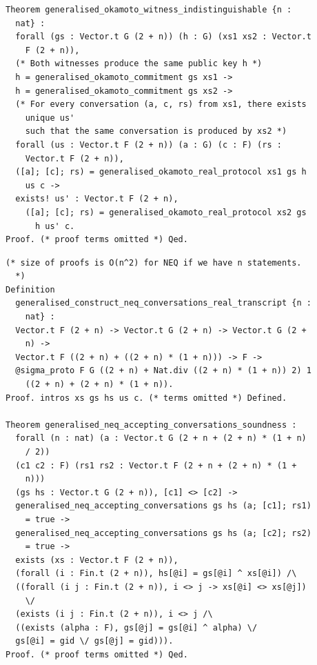 \documentclass[sigconf,anonymous,review]{acmart}
\begin{document}
\begin{lstlisting}[frame=single, language=Coq, caption={Witness Indistinguishability},
label={wit_ind},captionpos=t, basicstyle=\ttfamily\footnotesize,
abovecaptionskip=-\medskipamount]
Theorem generalised_okamoto_witness_indistinguishable {n :
  nat} :
  forall (gs : Vector.t G (2 + n)) (h : G) (xs1 xs2 : Vector.t
    F (2 + n)),
  (* Both witnesses produce the same public key h *)
  h = generalised_okamoto_commitment gs xs1 ->
  h = generalised_okamoto_commitment gs xs2 ->
  (* For every conversation (a, c, rs) from xs1, there exists
    unique us' 
    such that the same conversation is produced by xs2 *)
  forall (us : Vector.t F (2 + n)) (a : G) (c : F) (rs :
    Vector.t F (2 + n)),
  ([a]; [c]; rs) = generalised_okamoto_real_protocol xs1 gs h
    us c ->
  exists! us' : Vector.t F (2 + n),
    ([a]; [c]; rs) = generalised_okamoto_real_protocol xs2 gs
      h us' c.
Proof. (* proof terms omitted *) Qed.
\end{lstlisting}

\begin{lstlisting}[frame=single, language=Coq, caption={Neq $\Sigma$ Protocol},
label={neq_special_sound},captionpos=t, basicstyle=\ttfamily\footnotesize,
abovecaptionskip=-\medskipamount]
(* size of proofs is O(n^2) for NEQ if we have n statements.
  *) 
Definition
  generalised_construct_neq_conversations_real_transcript {n :
    nat} : 
  Vector.t F (2 + n) -> Vector.t G (2 + n) -> Vector.t G (2 +
    n) -> 
  Vector.t F ((2 + n) + ((2 + n) * (1 + n))) -> F ->
  @sigma_proto F G ((2 + n) + Nat.div ((2 + n) * (1 + n)) 2) 1
    ((2 + n) + (2 + n) * (1 + n)).
Proof. intros xs gs hs us c. (* terms omitted *) Defined. 

Theorem generalised_neq_accepting_conversations_soundness :
  forall (n : nat) (a : Vector.t G (2 + n + (2 + n) * (1 + n)
    / 2)) 
  (c1 c2 : F) (rs1 rs2 : Vector.t F (2 + n + (2 + n) * (1 +
    n))) 
  (gs hs : Vector.t G (2 + n)), [c1] <> [c2] ->
  generalised_neq_accepting_conversations gs hs (a; [c1]; rs1)
    = true ->
  generalised_neq_accepting_conversations gs hs (a; [c2]; rs2)
    = true ->
  exists (xs : Vector.t F (2 + n)), 
  (forall (i : Fin.t (2 + n)), hs[@i] = gs[@i] ^ xs[@i]) /\
  ((forall (i j : Fin.t (2 + n)), i <> j -> xs[@i] <> xs[@j])
    \/
  (exists (i j : Fin.t (2 + n)), i <> j /\ 
  ((exists (alpha : F), gs[@j] = gs[@i] ^ alpha) \/ 
  gs[@i] = gid \/ gs[@j] = gid))).
Proof. (* proof terms omitted *) Qed.
\end{lstlisting}
\end{document}
